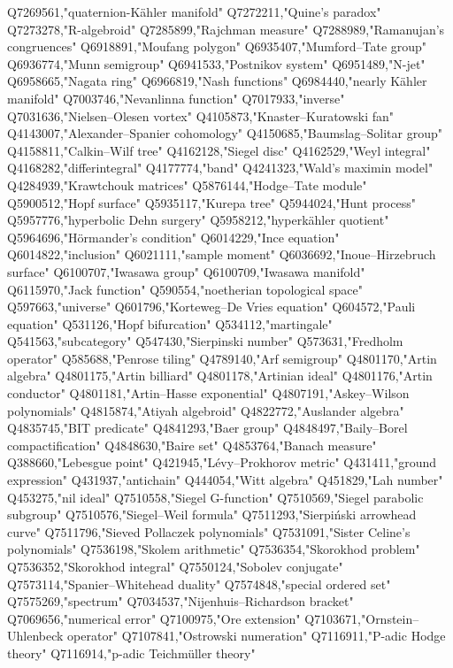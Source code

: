 Q7269561,"quaternion-Kähler manifold"
Q7272211,"Quine's paradox"
Q7273278,"R-algebroid"
Q7285899,"Rajchman measure"
Q7288989,"Ramanujan's congruences"
Q6918891,"Moufang polygon"
Q6935407,"Mumford–Tate group"
Q6936774,"Munn semigroup"
Q6941533,"Postnikov system"
Q6951489,"N-jet"
Q6958665,"Nagata ring"
Q6966819,"Nash functions"
Q6984440,"nearly Kähler manifold"
Q7003746,"Nevanlinna function"
Q7017933,"inverse"
Q7031636,"Nielsen–Olesen vortex"
Q4105873,"Knaster–Kuratowski fan"
Q4143007,"Alexander–Spanier cohomology"
Q4150685,"Baumslag–Solitar group"
Q4158811,"Calkin–Wilf tree"
Q4162128,"Siegel disc"
Q4162529,"Weyl integral"
Q4168282,"differintegral"
Q4177774,"band"
Q4241323,"Wald's maximin model"
Q4284939,"Krawtchouk matrices"
Q5876144,"Hodge–Tate module"
Q5900512,"Hopf surface"
Q5935117,"Kurepa tree"
Q5944024,"Hunt process"
Q5957776,"hyperbolic Dehn surgery"
Q5958212,"hyperkähler quotient"
Q5964696,"Hörmander's condition"
Q6014229,"Ince equation"
Q6014822,"inclusion"
Q6021111,"sample moment"
Q6036692,"Inoue–Hirzebruch surface"
Q6100707,"Iwasawa group"
Q6100709,"Iwasawa manifold"
Q6115970,"Jack function"
Q590554,"noetherian topological space"
Q597663,"universe"
Q601796,"Korteweg–De Vries equation"
Q604572,"Pauli equation"
Q531126,"Hopf bifurcation"
Q534112,"martingale"
Q541563,"subcategory"
Q547430,"Sierpinski number"
Q573631,"Fredholm operator"
Q585688,"Penrose tiling"
Q4789140,"Arf semigroup"
Q4801170,"Artin algebra"
Q4801175,"Artin billiard"
Q4801178,"Artinian ideal"
Q4801176,"Artin conductor"
Q4801181,"Artin–Hasse exponential"
Q4807191,"Askey–Wilson polynomials"
Q4815874,"Atiyah algebroid"
Q4822772,"Auslander algebra"
Q4835745,"BIT predicate"
Q4841293,"Baer group"
Q4848497,"Baily–Borel compactification"
Q4848630,"Baire set"
Q4853764,"Banach measure"
Q388660,"Lebesgue point"
Q421945,"Lévy–Prokhorov metric"
Q431411,"ground expression"
Q431937,"antichain"
Q444054,"Witt algebra"
Q451829,"Lah number"
Q453275,"nil ideal"
Q7510558,"Siegel G-function"
Q7510569,"Siegel parabolic subgroup"
Q7510576,"Siegel–Weil formula"
Q7511293,"Sierpiński arrowhead curve"
Q7511796,"Sieved Pollaczek polynomials"
Q7531091,"Sister Celine's polynomials"
Q7536198,"Skolem arithmetic"
Q7536354,"Skorokhod problem"
Q7536352,"Skorokhod integral"
Q7550124,"Sobolev conjugate"
Q7573114,"Spanier–Whitehead duality"
Q7574848,"special ordered set"
Q7575269,"spectrum"
Q7034537,"Nijenhuis–Richardson bracket"
Q7069656,"numerical error"
Q7100975,"Ore extension"
Q7103671,"Ornstein–Uhlenbeck operator"
Q7107841,"Ostrowski numeration"
Q7116911,"P-adic Hodge theory"
Q7116914,"p-adic Teichmüller theory"
